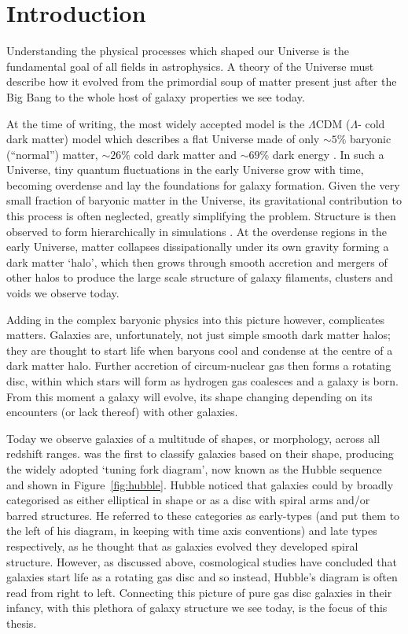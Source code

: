 \chapter{Introduction}\label{chap:intro}

Understanding the physical processes which shaped our Universe is the fundamental goal of all fields in astrophysics. A theory of the Universe must describe how it evolved from the primordial soup of matter present just after the Big Bang to the whole host of galaxy properties we see today. 

At the time of writing, the most widely accepted model is the $\Lambda$CDM ($\Lambda$- cold dark matter) model which describes a flat Universe made of only $\sim5\%$ baryonic (``normal'') matter, $\sim26\%$ cold dark matter and $\sim69\%$ dark energy \citep{planck16}. In such a Universe, tiny quantum fluctuations in the early Universe grow with time, becoming overdense and lay the foundations for galaxy formation. Given the very small fraction of baryonic matter in the Universe, its gravitational contribution to this process is often neglected, greatly simplifying the problem. Structure is then observed to form hierarchically in simulations \citep{citebomb}. At the overdense regions in the early Universe, matter collapses dissipationally under its own gravity forming a dark matter `halo', which then grows through smooth accretion and mergers of other halos to produce the large scale structure of galaxy filaments, clusters and voids we observe today. 

Adding in the complex baryonic physics into this picture however, complicates matters. Galaxies are, unfortunately, not just simple smooth dark matter halos; they are thought to start life when baryons cool and condense at the centre of a dark matter halo. Further accretion of circum-nuclear gas then forms a rotating disc, within which stars will form as hydrogen gas coalesces and a galaxy is born. From this moment a galaxy will evolve, its shape changing depending on its encounters (or lack thereof) with other galaxies. 

Today we observe galaxies of a multitude of shapes, or morphology, across all redshift ranges. \cite{hubble36}  was the first to classify galaxies based on their shape, producing the widely adopted `tuning fork diagram', now known as the Hubble sequence and shown in Figure~\ref{fig:hubble}. Hubble noticed that galaxies could by broadly categorised as either elliptical in shape or as a disc with spiral arms and/or barred structures. He referred to these categories as early-types (and put them to the left of his diagram, in keeping with time axis conventions) and late types respectively, as he thought that as galaxies evolved they developed spiral structure. However, as discussed above, cosmological studies have concluded that galaxies start life as a rotating gas disc and so instead, Hubble's diagram is often read from right to left. Connecting this picture of pure gas disc galaxies in their infancy, with this plethora of galaxy structure we see today, is the focus of this thesis. 


